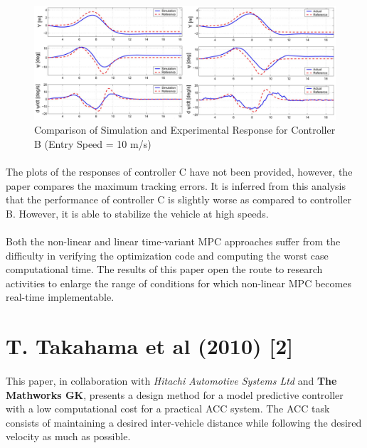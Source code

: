 \begin{figure}[H]\label{fig3.2}
\centering \includegraphics[width=\textwidth]{Images/paper1_controllerB_response.png}
\caption{Comparison of Simulation and Experimental Response for Controller B (Entry Speed = 10 m/s)}
\end{figure}

\paragraph{}
The plots of the responses of controller C have not been provided, however, the paper compares the maximum tracking errors. It is inferred from this analysis that the performance of controller C is slightly worse as compared to controller B. However, it is able to stabilize the vehicle at high speeds.

\paragraph{}
Both the non-linear and linear time-variant MPC approaches suffer from the difficulty in verifying the optimization code and computing the worst case computational time. The results of this paper open the route to research activities to enlarge the range of conditions for which non-linear MPC becomes real-time implementable.

\section{T. Takahama et al (2010) [2]}
\paragraph{}
This paper, in collaboration with \textit{Hitachi Automotive Systems Ltd} and \textbf{The Mathworks GK}, presents a design method for a model predictive controller with a low computational cost for a practical ACC system. The ACC task consists of maintaining a desired inter-vehicle distance while following the desired velocity as much as possible. 

